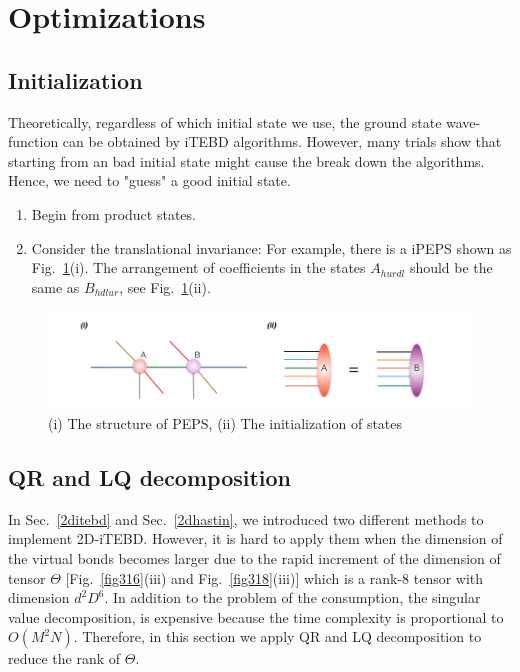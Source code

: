 \section{Optimizations}
\label{2dopt}

\subsection{Initialization}
\label{2doptInit}

Theoretically, regardless of which initial state we use, the ground state wave-function can be obtained by iTEBD algorithms. However, many trials show that starting from an bad initial state might cause the break down the algorithms. Hence, we need to "guess" a good initial state.

\begin{enumerate}
	\item Begin from product states.
	\item Consider the translational invariance: For example, there is a iPEPS shown as Fig.~\ref{fig321}(i). The arrangement of coefficients in the states $A_{hurdl}$ should be the same as $B_{hdlur}$, see Fig.~\ref{fig321}(ii).
\end{enumerate}

\begin{figure}[ht]
	\centering
	\includegraphics[width=1.00\textwidth]{figures/fig321.png}
	\caption[The diagrams of initializing projected entangled pair states]{(i) The structure of PEPS, (ii) The initialization of states}
	\label{fig321}
\end{figure}

\subsection{QR and LQ decomposition}
\label{2doptQR} 
In Sec.~\ref{2ditebd} and Sec.~\ref{2dhastin}, we introduced two different methods to implement 2D-iTEBD. However, it is hard to apply them when the dimension of the virtual bonds becomes larger due to the rapid increment of the dimension of tensor $\Theta$ [Fig.~\ref{fig316}(iii) and Fig.~\ref{fig318}(iii)] which is a rank-8 tensor with dimension $d^2D^6$. In addition to the problem of the consumption, the singular value decomposition, is expensive because the time complexity is proportional to $O(M^2N)$. Therefore, in this section we apply QR and LQ decomposition to reduce the rank of $\Theta$.

